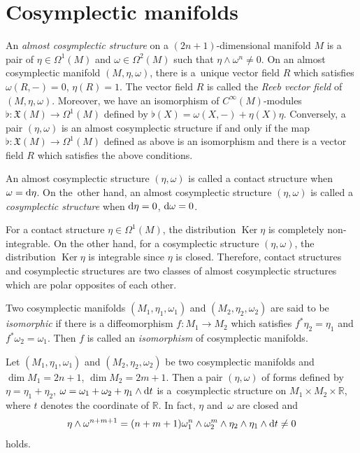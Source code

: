 \documentclass[10pt,a4paper]{amsart}
\numberwithin{equation}{section}
\begin{document}
\section{Cosymplectic manifolds}\label{cosymplectic}
An \textit{almost cosymplectic structure} on a $(2n+1)$-dimensional manifold $M$ is a pair of $\eta\in\Omega^1(M)$ and $\omega\in\Omega^2(M)$ such that $\eta\wedge\omega^n\neq0$. On an almost cosymplectic manifold $(M,\eta,\omega)$, there is a~unique vector field $R$ which satisfies
$\omega(R,-)=0$, $\eta(R)=1$.
The vector field $R$ is called the \textit{Reeb vector field} of $(M,\eta,\omega)$. Moreover, we have an isomorphism of $C^\infty(M)$-modules $\flat\colon\mathfrak{X}(M)\to \Omega^1(M)$ defined by $\flat(X)=\omega(X,-)+\eta(X)\eta$. Conversely, a pair $(\eta,\omega)$ is an almost cosymplectic structure if and only if the map $\flat\colon\mathfrak{X}(M)\to \Omega^1(M)$ defined as above is an isomorphism and there is a vector field $R$ which satisfies the above conditions.

An almost cosymplectic structure $(\eta,\omega)$ is called a contact structure when $\omega={\rm d}\eta$.
On the~other hand, an almost cosymplectic structure $(\eta,\omega)$ is called a \textit{cosymplectic structure} when ${{\rm d}\eta=0}$, $ {\rm d}\omega=0$.

For a contact structure $\eta\in\Omega^1(M)$, the distribution $\operatorname{Ker}\eta$ is completely non-integrable. On the other hand, for a cosymplectic structure $(\eta,\omega)$, the distribution $\operatorname{Ker}\eta$ is integrable since $\eta$ is closed. Therefore, contact structures and cosymplectic structures are two classes of almost cosymplectic structures which are polar opposites of each other.


Two cosymplectic manifolds $(M_1,\eta_1,\omega_1)$ and $(M_2,\eta_2,\omega_2)$ are said to be \textit{isomorphic} if there is a diffeomorphism $f\colon M_1\to M_2$ which satisfies $f^\ast\eta_2=\eta_1$ and $f^\ast\omega_2=\omega_1$. Then $f$ is called an \textit{isomorphism} of cosymplectic manifolds.


Let $(M_1,\eta_1,\omega_1)$ and $(M_2,\eta_2,\omega_2)$ be two cosymplectic manifolds and $\dim M_1=2n+1$, $\dim M_2=2m+1$. Then a pair $(\eta,\omega)$ of forms defined by
$\eta=\eta_1+\eta_2$, $\omega=\omega_1+\omega_2+\eta_1\wedge {\rm d}t$
is a~cosymplectic structure on $M_1\times M_2\times\mathbb{R}$, where $t$ denotes the coordinate of $\mathbb{R}$. In fact, $\eta$ and~$\omega$ are closed and
\[\eta\wedge\omega^{n+m+1}=(n+m+1)\omega_1^n\wedge\omega_2^m\wedge\eta_2\wedge\eta_1\wedge {\rm d}t\neq0\]
holds.
\end{document}

